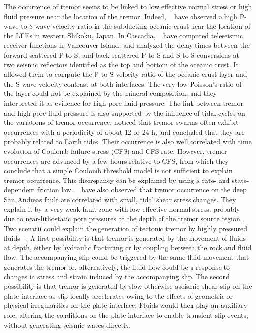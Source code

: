 \documentclass[draft]{agujournal2019}
\begin{document}
The occurrence of tremor seems to be linked to low effective normal stress or high fluid pressure near the location of the tremor. Indeed, ~ have observed a high P-wave to S-wave velocity ratio in the subducting oceanic crust near the location of the LFEs in western Shikoku, Japan. In Cascadia, ~ have computed teleseismic receiver functions in Vancouver Island, and analyzed the delay times between the forward-scattered P-to-S, and back-scattered P-to-S and S-to-S conversions at two seismic reflectors identified as the top and bottom of the oceanic crust. It allowed them to compute the P-to-S velocity ratio of the oceanic crust layer and the S-wave velocity contrast at both interfaces. The very low Poisson's ratio of the layer could not be explained by the mineral composition, and they interpreted it as evidence for high pore-fluid pressure. The link between tremor and high pore fluid pressure is also supported by the influence of tidal cycles on the variations of tremor occurrence.  noticed that tremor swarms often exhibit occurrences with a periodicity of about 12 or 24 h, and concluded that they are probably related to Earth tides. Their occurrence is also well correlated with time evolution of Coulomb failure stress (CFS) and CFS rate. However, tremor occurrences are advanced by a few hours relative to CFS, from which they conclude that a simple Coulomb threshold model is not sufficient to explain tremor occurrence. This discrepancy can be explained by using a rate- and state-dependent friction law. ~ have also observed that tremor occurrence on the deep San Andreas fault are correlated with small, tidal shear stress changes. They explain it by a very weak fault zone with low effective normal stress, probably due to near-lithostatic pore pressures at the depth of the tremor source region. \\

Two scenarii could explain the generation of tectonic tremor by highly pressured fluids ~\cite{SHE_2006}. A first possibility is that tremor is generated by the movement of fluids at depth, either by hydraulic fracturing or by coupling between the rock and fluid flow. The accompanying slip could be triggered by the same fluid movement that generates the tremor or, alternatively, the fluid flow could be a response to changes in stress and strain induced by the accompanying slip. The second possibility is that tremor is generated by slow otherwise aseismic shear slip on the plate interface as slip locally accelerates owing to the effects of geometric or physical irregularities on the plate interface. Fluids would then play an auxiliary role, altering the conditions on the plate interface to enable transient slip events, without generating seismic waves directly. \\
\end{document}
